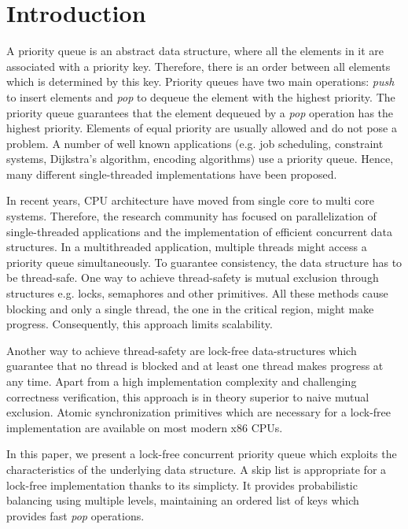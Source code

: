\section{Introduction}\label{sec:intro}

A priority queue is an abstract data structure, where all the elements in it are associated with a priority key.
Therefore, there is an order between all elements which is determined by this key. %
Priority queues have two main operations: \textit{push} to insert elements and \textit{pop} to dequeue the element with the highest priority.
The priority queue guarantees that the element dequeued by a \textit{pop} operation has the highest priority.
Elements of equal priority are usually allowed and do not pose a problem.
A number of well known applications (e.g. job scheduling, constraint systems, Dijkstra's algorithm, encoding algorithms) use a priority queue.
Hence, many different single-threaded implementations have been proposed.

In recent years, CPU architecture have moved from single core to multi core systems.
Therefore, the research community has focused on parallelization of single-threaded applications and the implementation of efficient concurrent data structures.
In a multithreaded application, multiple threads might access a priority queue simultaneously.
To guarantee consistency, the data structure has to be thread-safe.
One way to achieve thread-safety is mutual exclusion through structures e.g. locks, semaphores and other primitives.
All these methods cause blocking and only a single thread, the one in the critical region, might make progress.
Consequently, this approach limits scalability.

Another way to achieve thread-safety are lock-free data-structures which guarantee that no thread is blocked and at least one thread makes progress at any time.
Apart from a high implementation complexity and challenging correctness verification, this approach is in theory superior to naive mutual exclusion.
Atomic synchronization primitives which are necessary for a lock-free implementation are available on most modern x86 CPUs.

In this paper, we present a lock-free concurrent priority queue which exploits the characteristics of the underlying data structure.
A skip list \cite{Pugh:1990:SLP:78973.78977} is appropriate for a lock-free implementation thanks to its simplicty.
It provides probabilistic balancing using multiple levels, maintaining an ordered list of keys which provides fast \textit{pop} operations.

